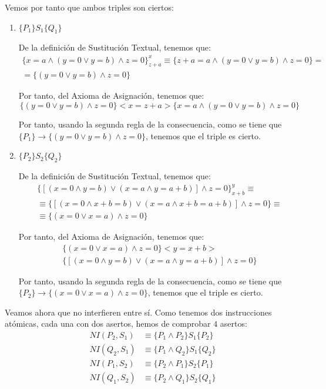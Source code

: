 \begin{ejercicio}
    Vemos por tanto que ambos triples son ciertos:
    \begin{enumerate}
        \item $\{P_1\} S_1 \{Q_1\}$
        
        De la definición de Sustitución Textual, tenemos que:
        \begin{multline*}
            \{x=a \land (y=0 \lor y=b) \land z = 0\}_{z+a}^x \equiv \{z+a=a \land (y=0 \lor y=b) \land z = 0\} =\\= \{(y=0 \lor y=b) \land z=0\}
        \end{multline*}

        Por tanto, del Axioma de Asignación, tenemos que:
        \begin{equation*}
            \{(y=0 \lor y=b) \land z = 0\} <x = z + a> \{x=a \land (y=0 \lor y=b) \land z = 0\}
        \end{equation*}

        Por tanto, usando la segunda regla de la consecuencia, como se tiene que $\{P_1\}\rightarrow\{(y=0 \lor y=b) \land z = 0\}$, tenemos que el triple es cierto.
        
        \item $\{P_2\} S_2 \{Q_2\}$
        
        De la definición de Sustitución Textual, tenemos que:
        \begin{multline*}
            \{[(x=0\land y=b) \lor (x=a\land y=a+b)] \land z=0\}_{x+b}^y \equiv \\ \equiv \{[(x=0\land x+b=b) \lor (x=a\land x+b=a+b)] \land z = 0\} \equiv \\ \equiv \{(x=0\lor x=a) \land z = 0\}
        \end{multline*}

        Por tanto, del Axioma de Asignación, tenemos que:
        \begin{multline*}
            \{(x=0\lor x=a) \land z = 0\} <y = x + b> \\ \{[(x=0\land y=b) \lor (x=a\land y=a+b)] \land z=0\}
        \end{multline*}

        Por tanto, usando la segunda regla de la consecuencia, como se tiene que $\{P_2\}\rightarrow\{(x=0\lor x=a) \land z = 0\}$, tenemos que el triple es cierto.
    \end{enumerate}

    Veamos ahora que no interfieren entre sí. Como tenemos dos instrucciones atómicas, cada una con dos asertos, hemos de comprobar $4$ asertos:
    \begin{align*}
        NI(P_2, S_1) & \equiv \{P_1\land P_2\} S_1 \{P_2\} \\
        NI(Q_2, S_1) & \equiv \{P_1\land Q_2\} S_1 \{Q_2\} \\
        NI(P_1, S_2) & \equiv \{P_2\land P_1\} S_2 \{P_1\} \\
        NI(Q_1, S_2) & \equiv \{P_2\land Q_1\} S_2 \{Q_1\}
    \end{align*}


\end{ejercicio}
